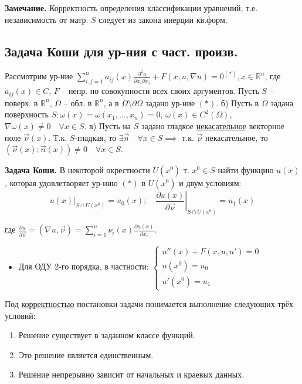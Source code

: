 \documentclass[12pt, a4paper]{article}
\begin{document}
\textbf{Замечание.} Корректность определения классификации уравнений, т.е. независимость от матр. $S$ следует из закона инерции кв.форм.

\subsection*{Задача Коши для ур-ния с част. произв.}
Рассмотрим ур-ние $\sum_{i,j=1}^n a_{ij}(x) \frac{\partial^2 u}{\partial x_i \partial x_j} + F(x,u,\nabla u) = 0^{(*)}, x \in \mathbb{R}^n$, где $a_{ij}(x) \in C$, $F$ -- непр. по совокупности всех своих аргументов.
Пусть $S$ -- поверх. в $\mathbb{R}^n$, $\Omega$ -- обл. в $\mathbb{R}^n$, а в $\Omega \setminus \partial \Omega$ задано ур-ние $(*)$.
б) Пусть в $\bar{\Omega}$ задана поверхность $S: \omega(x) = \omega(x_1, \dots, x_n) = 0$, $\omega(x) \in C^2(\Omega)$, $\nabla \omega(x) \ne 0 \quad \forall x \in S$.
в) Пусть на $S$ задано гладкое \underline{некасательное} векторное поле $\vec{\nu}(x)$.
Т.к. $S$-гладкая, то $\exists \vec{n} \quad \forall x \in S \implies$ т.к. $\vec{\nu}$ некасательное, то $(\vec{\nu}(x); \vec{n}(x)) \ne 0 \quad \forall x \in S$.

\textbf{Задача Коши.} В некоторой окрестности $U(x^0)$ т. $x^0 \in S$ найти функцию $u(x)$, которая удовлетворяет ур-нию $(*)$ в $U(x^0)$ и двум условиям:
\[
\left. u(x) \right|_{S \cap U(x^0)} = u_0(x); \quad \left. \frac{\partial u(x)}{\partial \vec{\nu}} \right|_{S \cap U(x^0)} = u_1(x)
\]

\hfill {} %





где $\frac{\partial u}{\partial \vec{\nu}} = (\nabla u, \vec{\nu}) = \sum_{i=1}^n \nu_i(x) \frac{\partial u(x)}{\partial x_i}$.
\begin{itemize}
    \item Для ОДУ 2-го порядка, в частности:
    $\begin{cases} u''(x) + F(x,u,u')=0 \\ u(x^0)=u_0 \\ u'(x^0)=u_1 \end{cases}$
\end{itemize}

Под \underline{корректностью} постановки задачи понимается выполнение следующих трёх условий:
\begin{enumerate}
    \item Решение существует в заданном классе функций.
    \item Это решение является единственным.
    \item Решение непрерывно зависит от начальных и краевых данных.
\end{enumerate}
\end{document}
